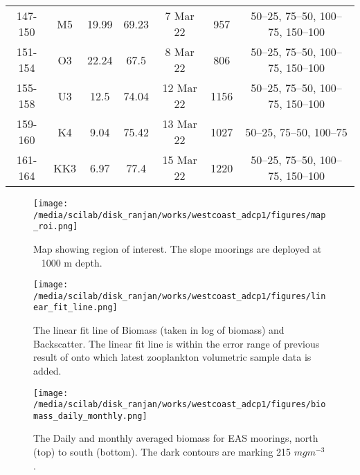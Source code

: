 \begin{table}[htbp]
{\begin{adjustwidth}{0.5in}{0in}
\begin{tabular}{ccccccc}
				147-150       & M5  & 19.99      & 69.23      & 7 Mar 22                  & 957        & 50–25, 75–50, 100–75, 150–100 \\
				151-154       & O3  & 22.24      & 67.5       & 8 Mar 22                  & 806        & 50–25, 75–50, 100–75, 150–100 \\
				155-158       & U3  & 12.5       & 74.04      & 12 Mar 22                 & 1156       & 50–25, 75–50, 100–75, 150–100 \\
				159-160       & K4  & 9.04       & 75.42      & 13 Mar 22                 & 1027       & 50–25, 75–50, 100–75          \\
				161-164       & KK3 & 6.97       & 77.4       & 15 Mar 22                 & 1220       & 50–25, 75–50, 100–75, 150–100
				\\ 
				\bottomrule
			\end{tabular}
		\end{adjustwidth}
	}
\end{table}


\newpage
\begin{figure}[htbp]
	\centering
	\texttt{[image: /media/scilab/disk\_ranjan/works/westcoast\_adcp1/figures/map\_roi.png]} 
	\captionsetup{justification=justified,font=footnotesize,skip=0.05\baselineskip,width=0.4\textwidth}
	\caption{Map showing region of interest. The slope moorings are deployed at ~ 1000 m depth.}
	\label{fig:fig1}
\end{figure}


\begin{figure}[htbp]
	\centering
	\texttt{[image: /media/scilab/disk\_ranjan/works/westcoast\_adcp1/figures/linear\_fit\_line.png]} 
	\captionsetup{justification=justified,font=footnotesize,skip=0.05\baselineskip,width=0.7\textwidth}
	\caption{The linear fit line of Biomass (taken in log of biomass) and Backscatter. The linear fit line is within the error range of previous result of \citep{aparna2022seasonal} onto which latest zooplankton volumetric sample data is added.}
	\label{fig:fig2}
\end{figure}


\newpage


\begin{figure}[htbp]
	\centering
	\texttt{[image: /media/scilab/disk\_ranjan/works/westcoast\_adcp1/figures/biomass\_daily\_monthly.png]} 
	\captionsetup{justification=justified,font=footnotesize,skip=0.05\baselineskip,width=\textwidth}
	\caption{The Daily and monthly averaged biomass for EAS moorings, north (top) to south (bottom). The dark contours are marking 215 $mg m^{-3}$.}
	\label{fig:fig3}
\end{figure}
